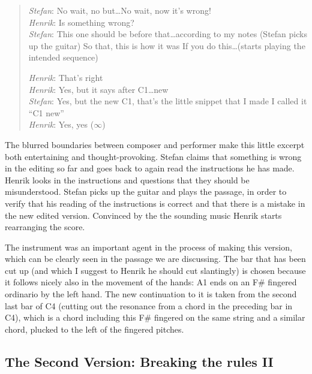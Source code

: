 \begin{quote}
  \emph{Stefan}: No wait, no but\ldots  No wait, now it's wrong!\\
  \emph{Henrik}: Is something wrong?\\
  \emph{Stefan}: This one should be before that\ldots according to my notes
  (Stefan picks up the guitar) So that, this is how it was If you do
  this\ldots (starts playing the intended sequence)

  \emph{Henrik}: That's right\\
  \emph{Henrik}: Yes, but it says after C1\ldots new\\
  \emph{Stefan}: Yes, but the new C1, that's the little snippet that I made I
  called it ``C1 new''\\
  \emph{Henrik}: Yes, yes ($\infty$)\\
\end{quote}

The blurred boundaries between composer and performer make this little
excerpt both entertaining and thought-provoking. Stefan claims that
something is wrong in the editing so far and goes back to again read
the instructions he has made. Henrik looks in the instructions and
questions that they should be misunderstood. Stefan picks up the
guitar and plays the passage, in order to verify that his reading of
the instructions is correct and that there is a mistake in the new
edited version. Convinced by the the sounding music Henrik starts
rearranging the score.
 
The instrument was an important agent in the process of making this
version, which can be clearly seen in the passage we are
discussing. The bar that has been cut up (and which I suggest to
Henrik he should cut slantingly) is chosen because it follows nicely
also in the movement of the hands: A1 ends on an F\# fingered
ordinario by the left hand. The new continuation to it is taken from
the second last bar of C4 (cutting out the resonance from a chord in
the preceding bar in C4), which is a chord including this F\# fingered
on the same string and a similar chord, plucked to the left of the
fingered pitches.

\subsection{The Second Version: Breaking the rules II}
\label{sec:second-vers-break-1}

